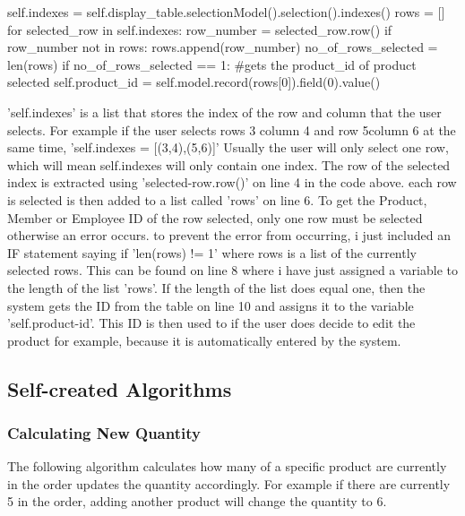 \begin{python}
self.indexes = self.display_table.selectionModel().selection().indexes()
rows = []
for selected_row in self.indexes:
	row_number = selected_row.row()
	if row_number not in rows:
		rows.append(row_number)      
no_of_rows_selected = len(rows)
if no_of_rows_selected == 1:
            #gets the product_id of product selected
            self.product_id = self.model.record(rows[0]).field(0).value()
\end{python}

'self.indexes' is a list that stores the index of the row and column that the user selects. For example if the user selects rows 3 column 4 and row 5column 6 at the same time, 'self.indexes = [(3,4),(5,6)]' Usually the user will only select one row, which will mean self.indexes will only contain one index. The row of the selected index is extracted using 'selected-row.row()' on line 4 in the code above. each row is selected is then added to a list called 'rows' on line 6. To get the Product, Member or Employee ID of the row selected, only one row must be selected otherwise an error occurs. to prevent the error from occurring, i just included an IF statement saying if 'len(rows) != 1' where rows is a list of the currently selected rows. This can be found on line 8 where i have just assigned a variable to the length of the list 'rows'. If the length of the list does equal one, then the system gets the ID from the table on line 10 and assigns it to the variable 'self.product-id'. This ID is then used to if the user does decide to edit the product for example, because it is automatically entered by the system.


\pagebreak

\subsection{Self-created Algorithms}

\subsubsection{Calculating New Quantity}

The following algorithm calculates how many of a specific product are currently in the order updates the quantity accordingly. For example if there are currently 5 in the order, adding another product will change the quantity to 6.


